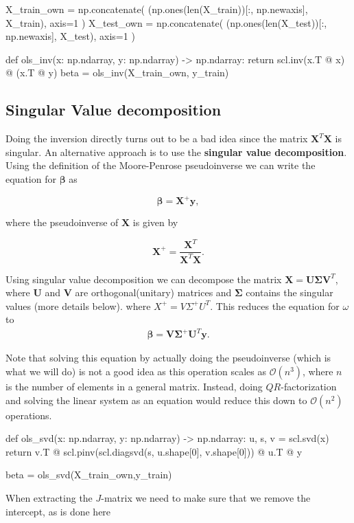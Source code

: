 \documentclass[%
oneside,                 %
final,                   %
10pt]{article}
\begin{document}
\bpycod
X_train_own = np.concatenate(
    (np.ones(len(X_train))[:, np.newaxis], X_train),
    axis=1
)
X_test_own = np.concatenate(
    (np.ones(len(X_test))[:, np.newaxis], X_test),
    axis=1
)
\epycod

\bpycod
def ols_inv(x: np.ndarray, y: np.ndarray) -> np.ndarray:
    return scl.inv(x.T @ x) @ (x.T @ y)
beta = ols_inv(X_train_own, y_train)
\epycod


\subsection{Singular Value decomposition}

Doing the inversion directly turns out to be a bad idea since the matrix
$\bm{X}^T\bm{X}$ is singular. An alternative approach is to use the \textbf{singular
value decomposition}. Using the definition of the Moore-Penrose
pseudoinverse we can write the equation for $\bm{\beta}$ as

\[
    \bm{\beta} = \bm{X}^{+}\bm{y},
\]

where the pseudoinverse of $\bm{X}$ is given by

\[
    \bm{X}^{+} = \frac{\bm{X}^T}{\bm{X}^T\bm{X}}.
\]

Using singular value decomposition we can decompose the matrix  $\bm{X} = \bm{U}\bm{\Sigma} \bm{V}^T$,
where $\bm{U}$ and $\bm{V}$ are orthogonal(unitary) matrices and $\bm{\Sigma}$ contains the singular values (more details below).
where $X^{+} = V\Sigma^{+} U^T$. This reduces the equation for
$\omega$ to
\begin{align}
    \bm{\beta} = \bm{V}\bm{\Sigma}^{+} \bm{U}^T \bm{y}.
\end{align}

Note that solving this equation by actually doing the pseudoinverse
(which is what we will do) is not a good idea as this operation scales
as $\mathcal{O}(n^3)$, where $n$ is the number of elements in a
general matrix. Instead, doing $QR$-factorization and solving the
linear system as an equation would reduce this down to
$\mathcal{O}(n^2)$ operations.


\bpycod
def ols_svd(x: np.ndarray, y: np.ndarray) -> np.ndarray:
    u, s, v = scl.svd(x)
    return v.T @ scl.pinv(scl.diagsvd(s, u.shape[0], v.shape[0])) @ u.T @ y
\epycod

\bpycod
beta = ols_svd(X_train_own,y_train)
\epycod

When extracting the $J$-matrix  we need to make sure that we remove the intercept, as is done here
\end{document}
